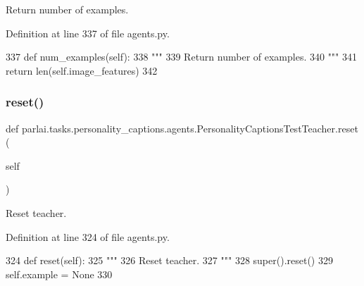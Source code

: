 \begin{DoxyVerb}Return number of examples.
\end{DoxyVerb}
 

Definition at line 337 of file agents.\+py.


\begin{DoxyCode}
337     \textcolor{keyword}{def }num\_examples(self):
338         \textcolor{stringliteral}{"""}
339 \textcolor{stringliteral}{        Return number of examples.}
340 \textcolor{stringliteral}{        """}
341         \textcolor{keywordflow}{return} len(self.image\_features)
342 
\end{DoxyCode}
\mbox{\label{classparlai_1_1tasks_1_1personality__captions_1_1agents_1_1PersonalityCaptionsTestTeacher_acb0270ac7c4e00d2e9067082599d4c16}} 
\subsubsection{\texorpdfstring{reset()}{reset()}}
{\footnotesize\ttfamily def parlai.\+tasks.\+personality\+\_\+captions.\+agents.\+Personality\+Captions\+Test\+Teacher.\+reset (\begin{DoxyParamCaption}\item[{}]{self }\end{DoxyParamCaption})}

\begin{DoxyVerb}Reset teacher.
\end{DoxyVerb}
 

Definition at line 324 of file agents.\+py.


\begin{DoxyCode}
324     \textcolor{keyword}{def }reset(self):
325         \textcolor{stringliteral}{"""}
326 \textcolor{stringliteral}{        Reset teacher.}
327 \textcolor{stringliteral}{        """}
328         super().reset()
329         self.example = \textcolor{keywordtype}{None}
330 
\end{DoxyCode}


